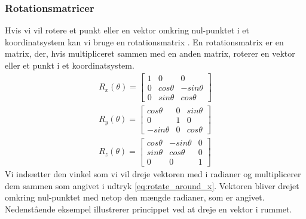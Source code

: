 \subsubsection{Rotationsmatricer}
\label{sec:rot_matricer}
Hvis vi vil rotere et punkt eller en vektor omkring nul-punktet i et koordinatsystem kan vi bruge en rotationsmatrix \cite{rotationsmatricer}.
En rotationsmatrix er en matrix, der, hvis multipliceret sammen med en anden matrix, roterer en vektor eller et punkt i et koordinatsystem.
\begin{align}\label{eu_eqn}
  R_x(\theta) = 
  \begin{bmatrix}
  \label{eq:rotate_around_x}
    1 & 0 & 0\\ 
    0 & cos \theta & - sin \theta\\ 
    0 & sin \theta & cos \theta
  \end{bmatrix}\\
    R_y(\theta) =
  \begin{bmatrix}
    cos \theta  & 0 & sin \theta\\ 
    0           & 1 & 0\\ 
    -sin \theta & 0 & cos \theta
  \end{bmatrix}\\
    R_z(\theta) = 
  \begin{bmatrix}
    cos \theta & - sin \theta & 0\\ 
    sin \theta & cos \theta & 0\\
    0 & 0 & 1
  \end{bmatrix}
\end{align}
Vi indsætter den vinkel som vi vil dreje vektoren med i radianer og multiplicerer dem sammen som angivet i udtryk \ref{eq:rotate_around_x}. Vektoren bliver drejet omkring nul-punktet med netop den mængde radianer, som er angivet.
Nedenstående eksempel illustrerer princippet ved at dreje en vektor i rummet.

